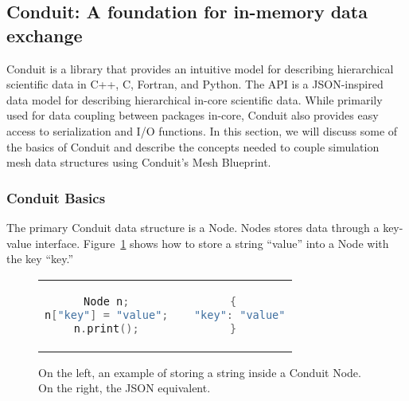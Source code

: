 \subsection{Conduit: A foundation for in-memory data exchange}
\label{sec:conduit}
Conduit is a library that provides an intuitive model for describing
hierarchical scientific data in C++, C, Fortran, and Python.
%
The API is a JSON-inspired data model for describing hierarchical
in-core scientific data.
%
While primarily used for data coupling between packages in-core,
Conduit also provides easy access to serialization and I/O functions.
%
In this section, we will discuss some of the basics of Conduit
and describe the concepts needed to couple simulation mesh
data structures using Conduit's Mesh Blueprint.


\subsubsection{Conduit Basics}
The primary Conduit data structure is a Node.
%
Nodes stores data through a key-value interface.
%
Figure~\ref{ex:1} shows how to store a string ``value'' into a Node
with the key ``key.''

\begin{figure}
\begin{tabular}{cc}
  \begin{minipage}{.5\textwidth}
  \centering
    \begin{lstlisting}[language=C++]
Node n;
n["key"] = "value";
n.print();
    \end{lstlisting}
  \end{minipage}
  &
  \begin{minipage}{.5\textwidth}
  \centering
  \begin{lstlisting}[language=C++]
{
  "key": "value"
}
  \end{lstlisting}
  \end{minipage}
\end{tabular}
\caption{\label{ex:1}On the left, an example of storing a string inside a Conduit Node. On the right, the JSON equivalent.}
\end{figure}

